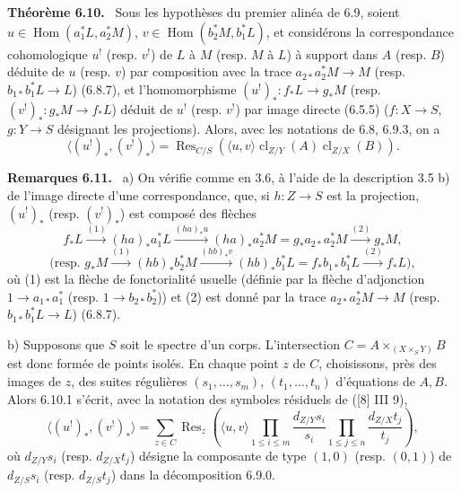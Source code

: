 \documentclass[11pt]{article}
\newenvironment{statement}[1]{\par\medskip\noindent\textbf{#1.}\ }{\par\medskip}
\DeclareMathOperator{\Hom}{Hom}
\providecommand{\cl}{\operatorname{cl}}
\providecommand{\Hom}{\operatorname{Hom}}
\providecommand{\cl}{\operatorname{cl}}
\begin{document}
\begin{statement}{Théorème 6.10}
Sous les hypothèses du premier alinéa de 6.9, soient $u\in\Hom(a_1^*L,a_2^*M)$, $v\in\Hom(b_2^*M,b_1^*L)$, et considérons la correspondance cohomologique $u^!$ (resp. $v^!$) de $L$ à $M$ (resp. $M$ à $L$) à support dans $A$ (resp. $B$) déduite de $u$ (resp. $v$) par composition avec la trace $a_{2*}a_2^*M\to M$ (resp. $b_{1*}b_1^*L\to L$) (6.8.7), et l'homomorphisme $(u^!)_*:f_*L\to g_*M$ (resp. $(v^!)_*:g_*M\to f_*L$) déduit de $u^!$ (resp. $v^!$) par image directe (6.5.5) ($f:X\to S$, $g:Y\to S$ désignant les projections). Alors, avec les notations de 6.8, 6.9.3, on a
\begin{equation}
\tag{6.10.1}
\langle (u^!)_*,(v^!)_*\rangle=\operatorname{Res}_{C/S}(\langle u,v\rangle\cl_{Z/Y}(A)\cl_{Z/X}(B)).
\end{equation}
\end{statement}

\begin{statement}{Remarques 6.11}
a) On vérifie comme en 3.6, à l'aide de la description 3.5 b) de l'image directe d'une correspondance, que, si $h:Z\to S$ est la projection, $(u^!)_*$ (resp. $(v^!)_*$) est composé des flèches
\[
f_*L\xrightarrow{(1)}(ha)_*a_1^*L\xrightarrow{(ha)_*u}(ha)_*a_2^*M=g_*a_{2*}a_2^*M\xrightarrow{(2)}g_*M,
\]
\[
\text{(resp. }g_*M\xrightarrow{(1)}(hb)_*b_2^*M\xrightarrow{(hb)_*v}(hb)_*b_1^*L=f_*b_{1*}b_1^*L\xrightarrow{(2)}f_*L\text{)},
\]
où (1) est la flèche de fonctorialité usuelle (définie par la flèche d'adjonction $1\to a_{1*}a_1^*$ (resp. $1\to b_{2*}b_2^*$)) et (2) est donné par la trace $a_{2*}a_2^*M\to M$ (resp. $b_{1*}b_1^*L\to L$) (6.8.7).

b) Supposons que $S$ soit le spectre d'un corps. L'intersection $C=A\times_{(X\times_S Y)}B$ est donc formée de points isolés. En chaque point $z$ de $C$, choisissons, près des images de $z$, des suites régulières $(s_1,\ldots,s_m)$, $(t_1,\ldots,t_n)$ d'équations de $A,B$. Alors 6.10.1 s'écrit, avec la notation des symboles résiduels de ([8] III 9),
\begin{equation}
\tag{6.11.1}
\langle (u^!)_*,(v^!)_*\rangle=
\sum_{z\in C}\operatorname{Res}_z\left(\langle u,v\rangle
\prod_{1\le i\le m}\frac{d_{Z/Y}s_i}{s_i}
\prod_{1\le j\le n}\frac{d_{Z/X}t_j}{t_j}\right),
\end{equation}
où $d_{Z/Y}s_i$ (resp. $d_{Z/X}t_j$) désigne la composante de type $(1,0)$ (resp. $(0,1)$) de $d_{Z/S}s_i$ (resp. $d_{Z/S}t_j$) dans la décomposition 6.9.0.
\end{statement}
\end{document}
